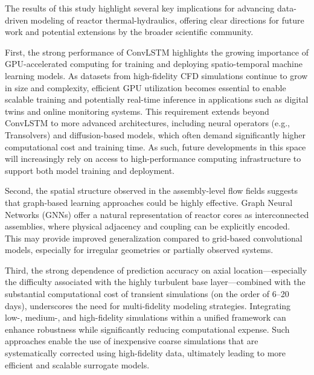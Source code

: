 \documentclass[review]{elsarticle}
\theoremstyle{definition}
\theoremstyle{definition}
\theoremstyle{remark}
\begin{document}
The results of this study highlight several key implications for advancing data-driven modeling of reactor thermal-hydraulics, offering clear directions for future work and potential extensions by the broader scientific community.

First, the strong performance of ConvLSTM highlights the growing importance of GPU-accelerated computing for training and deploying spatio-temporal machine learning models. As datasets from high-fidelity CFD simulations continue to grow in size and complexity, efficient GPU utilization becomes essential to enable scalable training and potentially real-time inference in applications such as digital twins and online monitoring systems. This requirement extends beyond ConvLSTM to more advanced architectures, including neural operators (e.g., Transolvers) and diffusion-based models, which often demand significantly higher computational cost and training time. As such, future developments in this space will increasingly rely on access to high-performance computing infrastructure to support both model training and deployment.

Second, the spatial structure observed in the assembly-level flow fields suggests that graph-based learning approaches could be highly effective. Graph Neural Networks (GNNs) offer a natural representation of reactor cores as interconnected assemblies, where physical adjacency and coupling can be explicitly encoded. This may provide improved generalization compared to grid-based convolutional models, especially for irregular geometries or partially observed systems. 

Third, the strong dependence of prediction accuracy on axial location—especially the difficulty associated with the highly turbulent base layer—combined with the substantial computational cost of transient simulations (on the order of 6–20 days), underscores the need for multi-fidelity modeling strategies. Integrating low-, medium-, and high-fidelity simulations within a unified framework can enhance robustness while significantly reducing computational expense. Such approaches enable the use of inexpensive coarse simulations that are systematically corrected using high-fidelity data, ultimately leading to more efficient and scalable surrogate models.
\end{document}

